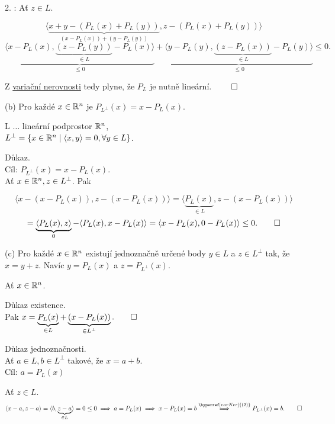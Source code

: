 2. : Ať $z \in L$.

\[
    \langle \underbrace{x + y - (P_L(x) + P_L(y))}_{(x-P_L(x)) + (y - P_L(y))}, z - (P_L (x) + P_L(y)) \rangle
\]
\[
    \underbrace{\langle x - P_L(x), \underbrace{(z - P_L(y))}_{\in L} - P_L(x)\rangle}_{\leq 0} + 
    \underbrace{\langle y - P_L(y), \underbrace{(z - P_L(x))}_{\in L}  - P_L (y)\rangle}_{\leq 0} \leq 0.
\]

Z \hyperref[varNer]{variační nerovnosti} tedy plyne, že $P_L$ je nutně lineární. $\qed$

\begin{multicols}{2}
    (b) Pro každé $x \in \mathbb{R}^n$ je $P_{L^\perp} (x) = x - P_L (x)$.

    L $\dots$ lineární podprostor $\mathbb{R}^n$,\\
    $L^\perp = \left\lbrace x \in \mathbb{R}^n \mid \langle x, y\rangle = 0, \forall y \in L \right\rbrace$.

    Důkaz.\\
    Cíl: $P_{L^\perp} (x) = x - P_L(x)$.\\
    Ať $x \in \mathbb{R}^n, z \in L^\perp$. Pak

\columnbreak

\end{multicols}

\[
    \langle x - (x - P_L(x)), z - (x - P_L(x))\rangle = \langle \underbrace{P_L(x)}_{\in L}, z - (x - P_L(x))\rangle
\]
\[
    = \underbrace{\langle P_L (x), z\rangle}_0 - \langle P_L (x), x-P_L(x)\rangle = \langle x - P_L (x), 0 - P_L(x)\rangle \leq 0. \qed
\]

(c) Pro každé $x \in \mathbb{R}^n$ existují jednoznačně určené body $y \in L$ a $z \in L^\perp$ tak, že $x=y + z$. Navíc 
$y = P_L(x)$ a $z=P_{L^ \perp} (x)$.

Ať $x \in \mathbb{R}^n$.

Důkaz existence.\\
Pak  $x = \underbrace{P_L (x)}_{\in L} + \underbrace{(x - P_L (x))}_{\in L^\perp}. \qed$

Důkaz jednoznačnosti.\\
Ať $a \in L, b \in L^\perp$ takové, že $x = a+b$.\\
Cíl: $a = P_L (x)$

Ať $z \in L$.
\[
    \langle x-a, z-a\rangle = \langle b, \underbrace{z-a}_{\in L}\rangle = 0 \leq 0 \implies a = P_L (x) \implies 
    x - P_L(x) = b \stackrel{\hyperref[varNer]{(2)}}{\implies} P_{L^\perp} (x) = b. \qed
\]
